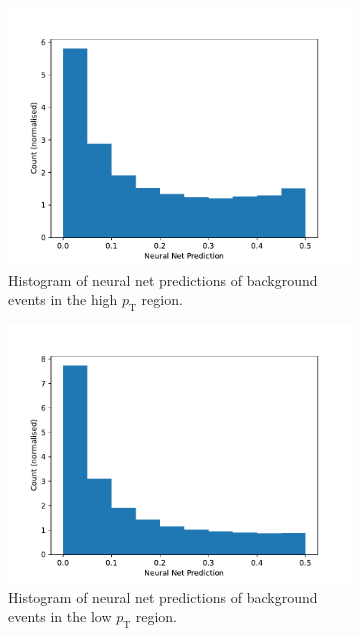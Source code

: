 \documentclass[11pt]{article}
\numberwithin{equation}{section}
\numberwithin{figure}{section}
\numberwithin{table}{section}
\begin{document}
\begin{figure}[h]%
    \centering
    \begin{subfigure}[t]{.49\linewidth}
        \centering
        \includegraphics[width=\linewidth]{Plots/bkg_high_pt.pdf}
        \caption{Histogram of neural net predictions of background events in the high $p_\mathrm{T}$ region.}
        \label{fig:bkg_high_pt}
    \end{subfigure}
    \hfill
    \begin{subfigure}[t]{.49\linewidth}
        \centering
        \includegraphics[width=\linewidth]{Plots/bkg_low_pt.pdf}
        \caption{Histogram of neural net predictions of background events in the low $p_\mathrm{T}$ region.}
        \label{fig:bkg_low_pt}
    \end{subfigure}
\caption{}
\label{}
\end{figure}
\end{document}
